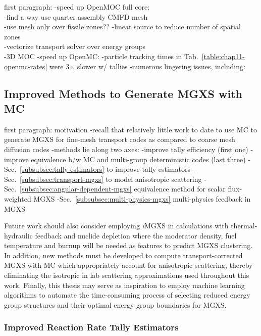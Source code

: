 first paragraph:
-speed up OpenMOC full core: \\
  -find a way use quarter assembly CMFD mesh \\
    -use mesh only over fissile zones??
  -linear source to reduce number of spatial zones \\
  -vectorize transport solver over energy groups \\
  -3D \ac{MOC}
-speed up OpenMC:
  -particle tracking times in Tab.~\ref{table:chap11-openmc-rates} were 3$\times$ slower w/ tallies
  -numerous lingering issues, including: 

\subsection{Improved Methods to Generate MGXS with MC}
\label{subsec:chap12-improve-mc-methods}

first paragraph: motivation
-recall that relatively little work to date to use \ac{MC} to generate \ac{MGXS} for fine-mesh transport codes as compared to coarse mesh diffusion codes
-methods lie along two axes:
  -improve tally efficiency (first one)
  -improve equivalence b/w \ac{MC} and multi-group deterministic codes (last three)
-Sec.~\ref{subsubsec:tally-estimators} to improve tally estimators
-Sec.~\ref{subsubsec:transport-mgxs} to model anisotropic scattering
-Sec.~\ref{subsubsec:angular-dependent-mgxs} equivalence method for scalar flux-weighted \ac{MGXS}
-Sec.~\ref{subsubsec:multi-physics-mgxs} multi-physics feedback in \ac{MGXS}

Future work should also consider employing \textit{i}MGXS in calculations with thermal-hydraulic feedback and nuclide depletion where the moderator density, fuel temperature and burnup will be needed as features to predict MGXS clustering. In addition, new methods must be developed to compute transport-corrected MGXS with MC which appropriately account for anisotropic scattering, thereby eliminating the isotropic in lab scattering approximations used throughout this work. Finally, this thesis may serve as inspiration to employ machine learning algorithms to automate the time-consuming process of selecting reduced energy group structures and their optimal energy group boundaries for MGXS.

\subsubsection{Improved Reaction Rate Tally Estimators}
\label{subsubsec:chap12-tally-estimators}

